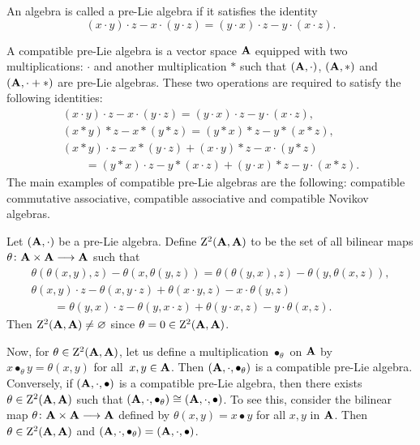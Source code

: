 \documentclass[10pt,a4paper]{amsart}
\numberwithin{equation}{section}
\begin{document}
\begin{Definition}
An algebra is called a pre-Lie algebra if it satisfies the identity
\[
( x\cdot y) \cdot z-x\cdot ( y\cdot
z)=( y\cdot x) \cdot z -y\cdot ( x\cdot z).
\]
\end{Definition}

\begin{Definition}
A compatible pre-Lie algebra is a vector space ${\bf A}$ equipped with
two multiplications: $\cdot$ and another multiplication $\ast$
such that $({\bf A}, \cdot)$, $({\bf A}, \ast)$ and
$({\bf A}, \cdot+ \ast)$ are pre-Lie algebras.
These two operations are required to satisfy the following identities:
\begin{gather*}
( x\cdot y) \cdot z-x\cdot ( y\cdot
z)=( y\cdot x) \cdot z -y\cdot ( x\cdot z),\\
( x\ast y) \ast z-x\ast ( y\ast
z)=( y\ast x) \ast z -y\ast ( x\ast z),\\
(x\ast y)\cdot z-x\ast (y\cdot z)+(x\cdot y)\ast z-x\cdot (y\ast z)\\
\qquad =
(y\ast x)\cdot z-y\ast (x\cdot z)+(y\cdot x)\ast z-y\cdot (x\ast z).
 \end{gather*}
The main examples of compatible pre-Lie algebras are the following:
compatible commutative associative,
compatible associative
and compatible Novikov algebras.
\end{Definition}


\begin{Definition}
Let $( {\bf A},\cdot ) $ be a pre-Lie
algebra. Define ${\rm Z}^{2}( {\bf A},{\bf A}) $ to be the
set of all bilinear maps
$\theta \colon{\bf A}\times {\bf A}\longrightarrow {\bf A}$ such that
\begin{gather*}
\theta(\theta( x, y), z)-\theta(x, \theta ( y, z))=\theta(\theta( y, x) , z) - \theta(y, \theta ( x, z)),\\
\theta(x, y)\cdot z-\theta(x, y\cdot z)
+\theta(x\cdot y, z) -x\cdot \theta(y, z)\\
\qquad =
\theta(y, x)\cdot z-\theta(y, x\cdot z)+
\theta(y\cdot x, z)-y\cdot \theta(x, z) .
 \end{gather*}
Then ${\rm Z}^{2}({\bf A},{\bf A})\neq {\varnothing }$ since $\theta=0\in {\rm Z}^{2}({\bf A},{\bf A})$.
\end{Definition}

Now, for $\theta \in {\rm Z}^{2}( {\bf A},{\bf A})$, let us define a multiplication
$\bullet_{\theta }$ on ${\bf A}$ by $x\bullet_{\theta}y=\theta ( x,y) $ for all~${x,y \in {\bf A}}$.
Then $( {\bf A},\cdot ,\bullet_{\theta }) $ is a compatible pre-Lie
algebra.
Conversely, if $( {\bf A},\cdot ,\bullet ) $ is a compatible pre-Lie algebra,
then there exists $\theta \in {\rm Z}^{2}(
{\bf A},{\bf A}) $ such that $(
{\bf A},\cdot ,\bullet_{\theta }) \cong( {\bf A},\cdot ,\bullet
)$. To see this, consider the bilinear map $\theta \colon{\bf A}\times {\bf A}\longrightarrow {\bf A}$ defined by $
\theta ( x,y) = x\bullet y$ for all $x,y$ in ${\bf A}$. Then $\theta \in {\rm Z}^{2}(
{\bf A},{\bf A}) $ and $(
{\bf A},\cdot ,\bullet_\theta ) =( {\bf A},\cdot ,\bullet
)$.
\end{document}
